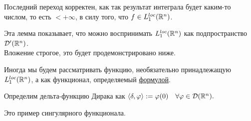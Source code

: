 \begin{remark}
    Последний переход корректен, как так результат интеграла будет каким-то числом, то есть $< +\infty$, в силу того, что $f \in L_1^{loc}(\mathbb{R}^n)$.
\end{remark}

\begin{note}
    Эта лемма показывает, что можно воспринимать $L_1^{loc}(\mathbb{R}^n)$ как подпространство $\mathcal{D}'(\mathbb{R}^n)$. \\
    Вложение строгое, это будет продемонстрировано ниже.
\end{note}


\begin{remark}
    Иногда мы будем рассматривать функцию, необязательно принадлежащую $L_1^{loc}(\mathbb{R}^n)$, а как функционал, определяемый \hyperref[lambda_f_functional]{формулой}.
\end{remark}

\begin{definition}
    Определим дельта-функцию Дирака как $\langle \delta, \varphi \rangle := \varphi(0) \quad \forall \varphi \in \mathcal{D}(\mathbb{R}^n).$
\end{definition}

\begin{remark}
    Это пример сингулярного функционала.
\end{remark}


